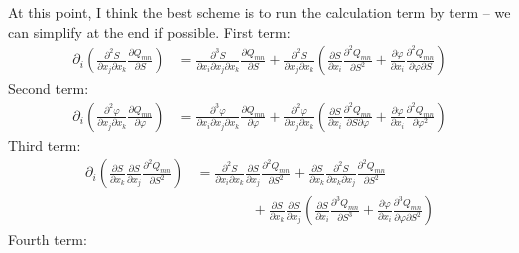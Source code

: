 \documentclass[reqno]{article}
\begin{document}
	At this point, I think the best scheme is to run the calculation term by term -- we can simplify at the end if possible. First term:
	\begin{equation} \label{eq:expand-begin}
	\begin{split}
		\partial_i \left( \frac{\partial^2 S}{\partial x_j \partial x_k} \frac{\partial Q_{mn}}{\partial S} \right) &= \frac{\partial^3 S}{\partial x_i \partial x_j \partial x_k} \frac{\partial Q_{mn}}{\partial S} + \frac{\partial^2 S}{\partial x_j \partial x_k} \left( \frac{\partial S}{\partial x_i} \frac{\partial^2 Q_{mn}}{\partial S^2} + \frac{\partial \varphi}{\partial x_i} \frac{\partial^2 Q_{mn}}{\partial \varphi \partial S} \right)
	\end{split}
	\end{equation}
	Second term:
	\begin{equation}
	\begin{split}
		\partial_i \left( \frac{\partial^2 \varphi}{\partial x_j \partial x_k} \frac{\partial Q_{mn}}{\partial \varphi} \right) &= \frac{\partial^3 \varphi}{\partial x_i \partial x_j \partial x_k}\frac{\partial Q_{mn}}{\partial \varphi} + \frac{\partial^2 \varphi}{\partial x_j \partial x_k} \left( \frac{\partial S}{\partial x_i} \frac{\partial ^2 Q_{mn}}{\partial S \partial \varphi} + \frac{\partial \varphi}{\partial x_i}\frac{\partial^2 Q_{mn}}{\partial \varphi^2} \right)
	\end{split}
	\end{equation}
	Third term:
	\begin{equation}
	\begin{split}
		\partial_i \left( \frac{\partial S}{\partial x_k} \frac{\partial S}{\partial x_j}\frac{\partial^2 Q_{mn}}{\partial S^2} \right) &= \frac{\partial^2 S}{\partial x_i \partial x_k} \frac{\partial S}{\partial x_j}\frac{\partial^2 Q_{mn}}{\partial S^2} + \frac{\partial S}{\partial x_k} \frac{\partial^2 S}{\partial x_k \partial x_j} \frac{\partial^2 Q_{mn}}{\partial S^2}\\
		&\qquad\qquad + \frac{\partial S}{\partial x_k}\frac{\partial S}{\partial x_j} \left( \frac{\partial S}{\partial x_i} \frac{\partial^3 Q_{mn}}{\partial S^3} + \frac{\partial \varphi}{\partial x_i} \frac{\partial^3 Q_{mn}}{\partial \varphi \partial S^2} \right)
	\end{split}
	\end{equation}
	Fourth term:
\end{document}
